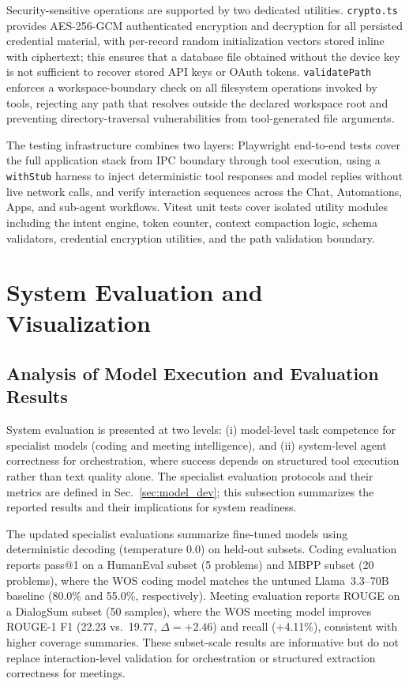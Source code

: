 \documentclass[conference]{IEEEtran}
\begin{document}
Security-sensitive operations are supported by two dedicated utilities. \texttt{crypto.ts} provides AES-256-GCM authenticated encryption and decryption for all persisted credential material, with per-record random initialization vectors stored inline with ciphertext; this ensures that a database file obtained without the device key is not sufficient to recover stored API keys or OAuth tokens. \texttt{validatePath} enforces a workspace-boundary check on all filesystem operations invoked by tools, rejecting any path that resolves outside the declared workspace root and preventing directory-traversal vulnerabilities from tool-generated file arguments.

The testing infrastructure combines two layers: Playwright end-to-end tests cover the full application stack from IPC boundary through tool execution, using a \texttt{withStub} harness to inject deterministic tool responses and model replies without live network calls, and verify interaction sequences across the Chat, Automations, Apps, and sub-agent workflows. Vitest unit tests cover isolated utility modules including the intent engine, token counter, context compaction logic, schema validators, credential encryption utilities, and the path validation boundary.
\section{System Evaluation and Visualization} \label{sec:eval}
\subsection{Analysis of Model Execution and Evaluation Results}
System evaluation is presented at two levels: (i) model-level task competence for specialist models (coding and meeting intelligence), and (ii) system-level agent correctness for orchestration, where success depends on structured tool execution rather than text quality alone. The specialist evaluation protocols and their metrics are defined in Sec.~\ref{sec:model_dev}; this subsection summarizes the reported results and their implications for system readiness.

The updated specialist evaluations summarize fine-tuned models using deterministic decoding (temperature 0.0) on held-out subsets. Coding evaluation reports pass@1 on a HumanEval subset (5 problems) and MBPP subset (20 problems), where the WOS coding model matches the untuned Llama~3.3--70B baseline (80.0\% and 55.0\%, respectively). Meeting evaluation reports ROUGE on a DialogSum subset (50 samples), where the WOS meeting model improves ROUGE-1 F1 (22.23 vs.\ 19.77, \(\Delta=+2.46\)) and recall (+4.11\%), consistent with higher coverage summaries. These subset-scale results are informative but do not replace interaction-level validation for orchestration or structured extraction correctness for meetings.
\end{document}
